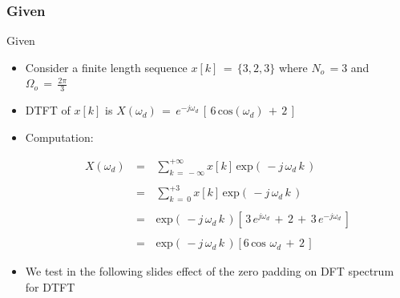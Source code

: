 \documentclass{beamer}
\begin{document}
\subsubsection{Given}
\begin{frame}[t,allowframebreaks]{Given}

\begin{itemize}

\item Consider a finite length sequence $x[k] \, = \, \{3,2,3\}$ where $N_o \, = 3$ and $\Omega_o \, = \, \displaystyle\frac{2 \pi}{3}$


\item DTFT of $x[k]$ is $X(\omega_d) \, = \, e^{-j \omega_d} \, \left[ \, 6 \, \text{cos}(\omega_d) \, + \, 2  \,\right]$

\item Computation:

\begin{equation*}
\begin{array}{rcl}
X(\omega_d) \, &=& \, \displaystyle\sum_{k \, = \, - \infty}^{+ \infty} x[k] \, \text{exp} \left( \,-j \, \omega_d \, k  \,\right) \\ \\
&=& \, \displaystyle\sum_{k \, = \, 0}^{+ 3} x[k] \, \text{exp} \left( \,-j \, \omega_d \, k  \,\right) \\ \\

&=& \, \text{exp} \left( \,-j \, \omega_d \, k  \,\right) \left[ \, 3 \, e^{j \omega_d} \, + \, 2  \, + \, 3 \,  e^{-j \omega_d} \,\right] \\ \\
&=& \, \text{exp} \left( \,-j \, \omega_d \, k  \,\right) \left[ 6 \, \text{cos }\omega_d \, + \, 2 \,\right]
\end{array}
\end{equation*}


\item We test in the following slides effect of the zero padding on DFT spectrum for DTFT

\end{itemize}

\end{frame}
\end{document}
